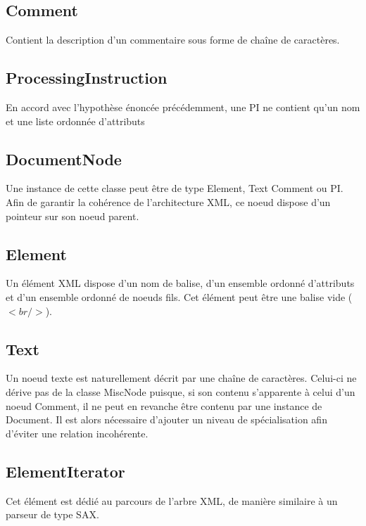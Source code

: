     \subsection{Comment}
        Contient la description d'un commentaire sous forme de chaîne de caractères.

    \subsection{ProcessingInstruction}
        En accord avec l'hypothèse énoncée précédemment, une PI ne contient qu'un nom et une liste ordonnée d'attributs

    \subsection{DocumentNode}
        Une instance de cette classe peut être de type Element, Text Comment ou PI. Afin de garantir la cohérence de l'architecture XML, ce noeud dispose d'un pointeur sur son noeud parent.

    \subsection{Element}
        Un élément XML dispose d'un nom de balise, d'un ensemble ordonné d'attributs et d'un ensemble ordonné de noeuds fils. Cet élément peut être une balise vide ($<br/>$).

    \subsection{Text}
        Un noeud texte est naturellement décrit par une chaîne de caractères. Celui-ci ne dérive pas de la classe MiscNode puisque, si son contenu s'apparente à celui d'un noeud Comment, il ne peut en revanche être contenu par une instance de Document. Il est alors nécessaire d'ajouter un niveau de spécialisation afin d'éviter une relation incohérente.

    \subsection{ElementIterator}
        Cet élément est dédié au parcours de l'arbre XML, de manière similaire à un parseur de type SAX.
